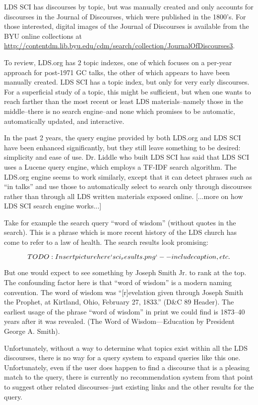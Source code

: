 LDS SCI has discourses by topic, but was manually created and only accounts for discourses in the Journal of Discourses, which were published in the 1800’s. For those interested, digital images of the Journal of Discourses is available from the BYU online collections at \url{http://contentdm.lib.byu.edu/cdm/search/collection/JournalOfDiscourses3}.

To review, LDS.org has 2 topic indexes, one of which focuses on a per-year approach for post-1971 GC talks, the other of which appears to have been manually created. LDS SCI has a topic index, but only for very early discourses. For a superficial study of a topic, this might be sufficient, but when one wants to reach farther than the most recent or least LDS materials--namely those in the middle--there is no search engine--and none which promises to be automatic, automatically updated, and interactive.

In the past 2 years, the query engine provided by both LDS.org and LDS SCI have been enhanced significantly, but they still leave something to be desired: simplicity and ease of use. Dr. Liddle who built LDS SCI has said that LDS SCI uses a Lucene query engine, which employs a TF-IDF search algorithm. The LDS.org engine seems to work similarly, except that it can detect phrases such as ``in talks'' and use those to automatically select to search only through discourses rather than through all LDS written materials exposed online. [...more on how LDS SCI search engine works...]

Take for example the search query ``word of wisdom'' (without quotes in the search). This is a phrase which is more recent history of the LDS church has come to refer to a law of health. The search results look promising:

\[TODO: Insert picture here `sci_results.png`--include caption, etc.\]

But one would expect to see something by Joseph Smith Jr. to rank at the top. The confounding factor here is that ``word of wisdom'' is a modern naming convention. %
The word of wisdom was ``[r]evelation given through Joseph Smith the Prophet, at Kirtland, Ohio, February 27, 1833.'' (D\&C 89 Header). The earliest usage of the phrase ``word of wisdom'' in print we could find is 1873--40 years after it was revealed. (The Word of Wisdom—Education by President George A. Smith).

Unfortunately, without a way to determine what topics exist within all the LDS discourses, there is no way for a query system to expand queries like this one. Unfortunately, even if the user does happen to find a discourse that is a pleasing match to the query, there is currently no recommendation system from that point to suggest other related discourses--just existing links and the other results for the query.

